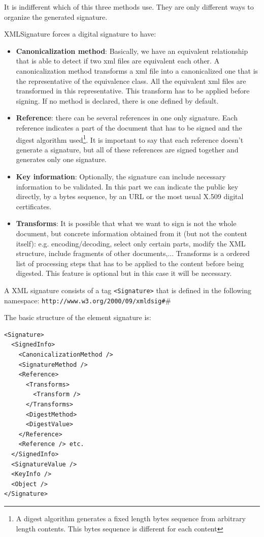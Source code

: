 It is indifferent which of this three methods use. They are only different
ways to organize the generated signature. 

XMLSignature forces a digital signature to have:
\begin{itemize}
\item \textbf{Canonicalization method}: Basically, we have an equivalent relationship
that is able to detect if two xml files are equivalent each other. A canonicalization method transforms a xml file into a canonicalized one that is the representative
of the equivalence class. All the equivalent xml files are transformed
in this representative. This transform has to be applied before signing. If no method is declared, there is one defined by default.
\item \textbf{Reference}: there can be several references in one only signature.
Each reference indicates a part of the document that has to be signed and
the digest algorithm used\footnote{A digest algorithm generates a fixed length
bytes sequence from arbitrary length contents. This bytes sequence is different
for each content}. It is important to say that each reference doesn't generate
a signature, but all of these references are signed together and generates only
one signature.
\item \textbf{Key information}: Optionally, the signature can include necessary
information to be validated. In this part we can indicate the public key
directly, by a bytes sequence, by an URL or the most usual X.509 digital certificates.
\item \textbf{Transforms}: It is possible that what we want to sign is not
the whole document, but concrete information obtained from it (but not the
content itself): e.g. encoding/decoding, select only certain parts, modify the XML structure,
include fragments of other documents,... Transforms is a ordered list of
processing steps that has to be applied to the content before being digested.  This feature is optional but in this case it will be necessary.
\end{itemize}

A XML signature consists of a  tag \texttt{<Signature>}
that is defined in the following namespace: \texttt{http://www.w3.org/2000/09/xmldsig\#}# 

The basic structure of the element signature is:

\begin{lstlisting}
<Signature>
  <SignedInfo>
    <CanonicalizationMethod />
    <SignatureMethod />
    <Reference>
      <Transforms>
        <Transform />
      </Transforms> 
      <DigestMethod>
      <DigestValue>
    </Reference>
    <Reference /> etc.
  </SignedInfo>
  <SignatureValue />
  <KeyInfo />
  <Object />
</Signature>
\end{lstlisting}

